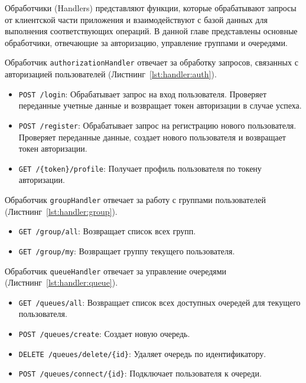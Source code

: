 
Обработчики (Handlers) представляют функции,
которые обрабатывают запросы от клиентской части приложения
и взаимодействуют с базой данных для выполнения соответствующих операций.
В данной главе представлены основные обработчики, отвечающие за авторизацию,
управление группами и очередями.

Обработчик \texttt{authorizationHandler} отвечает за обработку запросов,
связанных с авторизацией пользователей
(Листнинг~\ref{lst:handler:auth}).

\begin{itemize}
    \item \texttt{POST /login}: Обрабатывает запрос на вход пользователя.
		Проверяет переданные учетные данные и возвращает токен авторизации
		в случае успеха.
    \item \texttt{POST /register}: Обрабатывает запрос на регистрацию нового
		пользователя. Проверяет переданные данные,
		создает нового пользователя и возвращает токен авторизации.
    \item \texttt{GET /\{token\}/profile}: Получает профиль пользователя
		по токену авторизации.
\end{itemize}

Обработчик \texttt{groupHandler} отвечает за работу с группами пользователей
(Листнинг~\ref{lst:handler:group}).

\begin{itemize}
    \item \texttt{GET /group/all}: Возвращает список всех групп.
    \item \texttt{GET /group/my}: Возвращает группу текущего пользователя.
\end{itemize}

Обработчик \texttt{queueHandler} отвечает за управление очередями
(Листнинг~\ref{lst:handler:queue}).

\begin{itemize}
    \item \texttt{GET /queues/all}: Возвращает список всех доступных очередей
		для текущего пользователя.
    \item \texttt{POST /queues/create}: Создает новую очередь.
    \item \texttt{DELETE /queues/delete/\{id\}}:
		Удаляет очередь по идентификатору.
    \item \texttt{POST /queues/connect/\{id\}}:
		Подключает пользователя к очереди.
\end{itemize}

